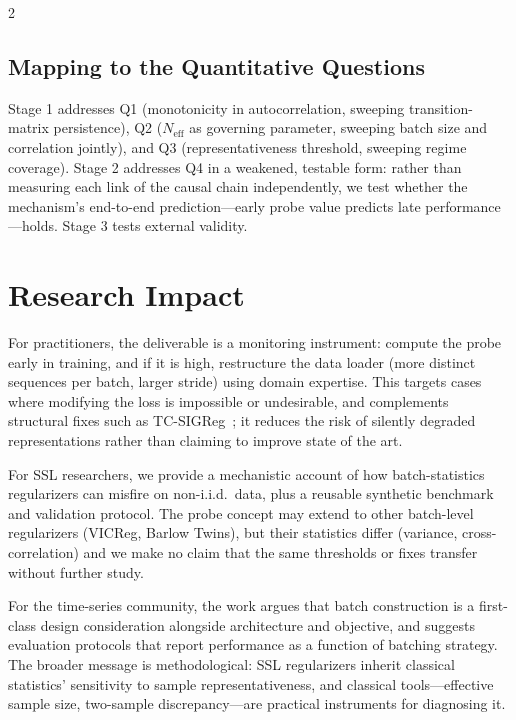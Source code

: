 \documentclass[10pt]{article}
\theoremstyle{remark}
\begin{document}
\begin{multicols*}{2}
\subsection{Mapping to the Quantitative Questions}

Stage 1 addresses Q1 (monotonicity in autocorrelation, sweeping transition-matrix persistence), Q2 ($N_{\mathrm{eff}}$ as governing parameter, sweeping batch size and correlation jointly), and Q3 (representativeness threshold, sweeping regime coverage). Stage 2 addresses Q4 in a weakened, testable form: rather than measuring each link of the causal chain independently, we test whether the mechanism's end-to-end prediction---early probe value predicts late performance---holds. Stage 3 tests external validity.

\section{Research Impact}

For practitioners, the deliverable is a monitoring instrument: compute the probe early in training, and if it is high, restructure the data loader (more distinct sequences per batch, larger stride) using domain expertise. This targets cases where modifying the loss is impossible or undesirable, and complements structural fixes such as TC-SIGReg~\cite{liu2026tclwm}; it reduces the risk of silently degraded representations rather than claiming to improve state of the art.

For SSL researchers, we provide a mechanistic account of how batch-statistics regularizers can misfire on non-i.i.d.\ data, plus a reusable synthetic benchmark and validation protocol. The probe concept may extend to other batch-level regularizers (VICReg, Barlow Twins), but their statistics differ (variance, cross-correlation) and we make no claim that the same thresholds or fixes transfer without further study.

For the time-series community, the work argues that batch construction is a first-class design consideration alongside architecture and objective, and suggests evaluation protocols that report performance as a function of batching strategy. The broader message is methodological: SSL regularizers inherit classical statistics' sensitivity to sample representativeness, and classical tools---effective sample size, two-sample discrepancy---are practical instruments for diagnosing it.

\end{multicols*}
\end{document}
